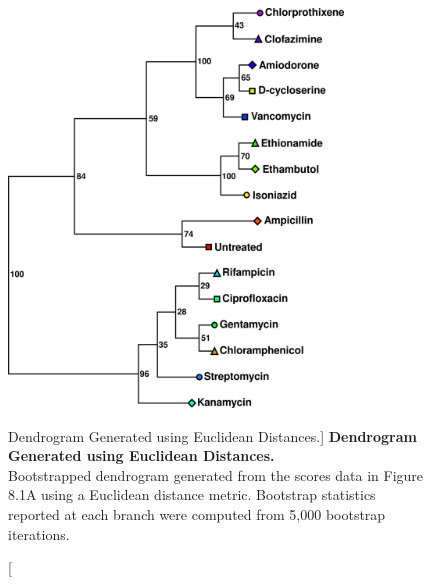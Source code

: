\begin{figure}
\includegraphics[width=3.5in]{figs/utils/03.png}
\caption
      [Dendrogram Generated using Euclidean Distances.]{
  {\bf Dendrogram Generated using Euclidean Distances.}
  \\
  Bootstrapped dendrogram generated from the scores data in Figure 8.1A using
  a Euclidean distance metric. Bootstrap statistics reported at each branch
  were computed from 5,000 bootstrap iterations.
}
\end{figure}

